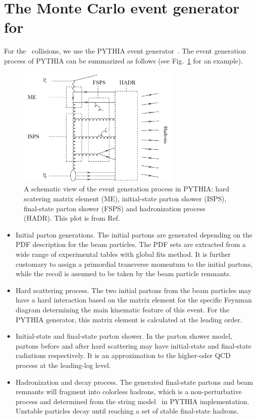\section{The Monte Carlo event generator for \ep\ } \label{sec:MC_ep}
For the \ep\ collisions, we use the PYTHIA event generator~\cite{Sjostrand:2006za}. The event generation
process of PYTHIA can be summarized as follows (see Fig.~\ref{fig:PYTHIA_generation_scheme} for an example).
\begin{figure}
\centering
\includegraphics[width=0.7\textwidth]{plots/chpt5/PYTHIA_generation_scheme.png}
\caption[An illustration of the event generation process in PYTHIA] {
A schematic view of the event generation process in PYTHIA: hard scatering matrix element (ME), 
initial-state parton shower (ISPS), final-state parton shower (FSPS) and hadronization process (HADR). 
This plot is from Ref.~\cite{Hansson:2007zz} }
\label{fig:PYTHIA_generation_scheme}
\end{figure}
\begin{itemize}
\item Initial parton generations. The initial partons are generated depending
on the PDF description for the beam particles. The PDF sets are extracted from
a wide range of experimental tables with global fits method. It is further customary to assign a primordial transverse momentum to the initial partons, while the recoil is assumed to be taken by the beam particle remnants. 
\item Hard scattering process. The two initial partons from the beam particles may
have a hard interaction based on the matrix element for the specific Feynman diagram
determining the main kinematic feature of this event. For the PYTHIA generator, this
matrix element is calculated at the leading order.
\item Initial-state and final-state parton shower. In the parton shower model, partons
before and after hard scattering may have initial-state and final-state radiations respectively. It
is an approximation to the higher-oder QCD process at the leading-log level. 
\item Hadronization and decay process. The generated final-state partons and
beam remnants will fragment into colorless hadrons, which is a non-perturbative process
and determined from the string model~\cite{Andersson:1983ia} in PYTHIA implementation. Unstable particles decay
until reaching a set of stable final-state hadrons.
\end{itemize}

